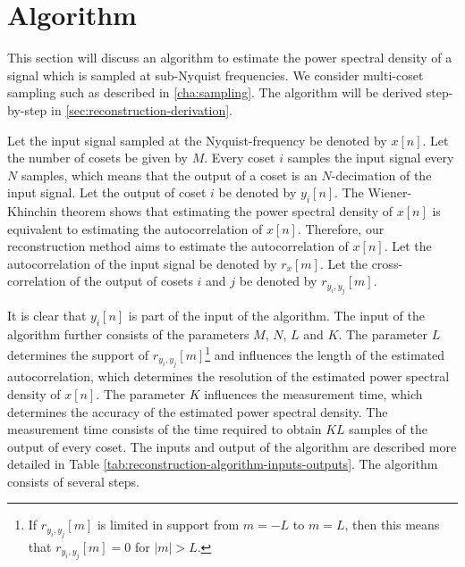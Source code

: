 \documentclass[a4paper, openany, oneside]{memoir}
\begin{document}
\section{Algorithm}
This section will discuss an algorithm to estimate the power spectral density of a signal which is sampled at sub-Nyquist frequencies. We consider multi-coset sampling such as described in \cref{cha:sampling}. The algorithm will be derived step-by-step in \cref{sec:reconstruction-derivation}.

Let the input signal sampled at the Nyquist-frequency be denoted by $x[n]$. Let the number of cosets be given by $M$. Every coset $i$ samples the input signal every $N$ samples, which means that the output of a coset is an $N$-decimation of the input signal. Let the output of coset $i$ be denoted by $y_i[n]$. The Wiener-Khinchin theorem shows that estimating the power spectral density of $x[n]$ is equivalent to estimating the autocorrelation of $x[n]$. Therefore, our reconstruction method aims to estimate the autocorrelation of $x[n]$. Let the autocorrelation of the input signal be denoted by $r_x[m]$. Let the cross-correlation of the output of cosets $i$ and $j$ be denoted by $r_{y_i,y_j}[m]$. 

It is clear that $y_i[n]$ is part of the input of the algorithm. The input of the algorithm further consists of the parameters $M$, $N$, $L$ and $K$. The parameter $L$ determines the support of $r_{y_i,y_j}[m]$\footnote{If $r_{y_i,y_j}[m]$ is limited in support from $m=-L$ to $m=L$, then this means that $r_{y_i,y_j}[m]=0$ for $|m|>L$.} and influences the length of the estimated autocorrelation, which determines the resolution of the estimated power spectral density of $x[n]$. The parameter $K$ influences the measurement time, which determines the accuracy of the estimated power spectral density. The measurement time consists of the time required to obtain $KL$ samples of the output of every coset. The inputs and output of the algorithm are described more detailed in Table \ref{tab:reconstruction-algorithm-inputs-outputs}. The algorithm consists of several steps.
\end{document}
